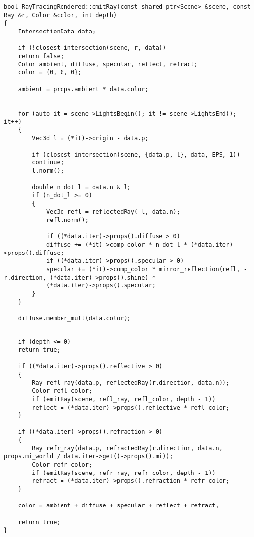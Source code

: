 \begin{center}
	\captionsetup{justification=raggedright,singlelinecheck=off}
	\begin{lstlisting}[label=lst:emit1,caption=Расчёт освещения для луча (начало)]
bool RayTracingRendered::emitRay(const shared_ptr<Scene> &scene, const Ray &r, Color &color, int depth)
{
	IntersectionData data;
	
	if (!closest_intersection(scene, r, data))
	return false;
	Color ambient, diffuse, specular, reflect, refract;
	color = {0, 0, 0};
	
	ambient = props.ambient * data.color;
	
	
	for (auto it = scene->LightsBegin(); it != scene->LightsEnd(); it++)
	{
		Vec3d l = (*it)->origin - data.p;
		
		if (closest_intersection(scene, {data.p, l}, data, EPS, 1))
		continue;
		l.norm();
		
		double n_dot_l = data.n & l;
		if (n_dot_l >= 0)
		{
			Vec3d refl = reflectedRay(-l, data.n);
			refl.norm();
			
			if ((*data.iter)->props().diffuse > 0)
			diffuse += (*it)->comp_color * n_dot_l * (*data.iter)->props().diffuse;
			if ((*data.iter)->props().specular > 0)
			specular += (*it)->comp_color * mirror_reflection(refl, -r.direction, (*data.iter)->props().shine) *
			(*data.iter)->props().specular;
		}
	}
	
	diffuse.member_mult(data.color);
	\end{lstlisting}
\end{center}


\begin{center}
	\captionsetup{justification=raggedright,singlelinecheck=off}
	\begin{lstlisting}[label=lst:emit2,caption=Расчёт освещения для луча (окончание)]
	
	if (depth <= 0)
	return true;
	
	if ((*data.iter)->props().reflective > 0)
	{
		Ray refl_ray(data.p, reflectedRay(r.direction, data.n));
		Color refl_color;
		if (emitRay(scene, refl_ray, refl_color, depth - 1))
		reflect = (*data.iter)->props().reflective * refl_color;
	}
	
	if ((*data.iter)->props().refraction > 0)
	{
		Ray refr_ray(data.p, refractedRay(r.direction, data.n, props.mi_world / data.iter->get()->props().mi));
		Color refr_color;
		if (emitRay(scene, refr_ray, refr_color, depth - 1))
		refract = (*data.iter)->props().refraction * refr_color;
	}
	
	color = ambient + diffuse + specular + reflect + refract;
	
	return true;
}
	\end{lstlisting}
\end{center}

